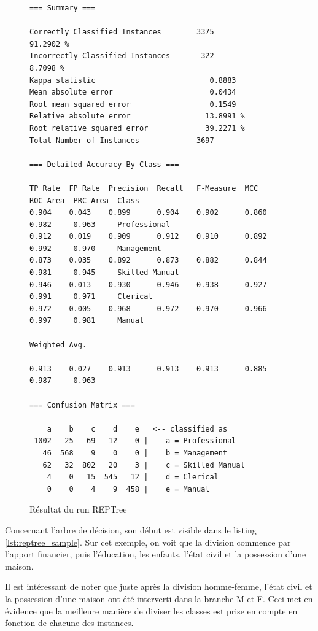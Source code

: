 \begin{figure}[H]
\centering
\begin{lstlisting}
=== Summary ===

Correctly Classified Instances        3375               91.2902 %
Incorrectly Classified Instances       322                8.7098 %
Kappa statistic                          0.8883
Mean absolute error                      0.0434
Root mean squared error                  0.1549
Relative absolute error                 13.8991 %
Root relative squared error             39.2271 %
Total Number of Instances             3697

=== Detailed Accuracy By Class ===

TP Rate  FP Rate  Precision  Recall   F-Measure  MCC      ROC Area  PRC Area  Class
0.904    0.043    0.899      0.904    0.902      0.860    0.982     0.963     Professional
0.912    0.019    0.909      0.912    0.910      0.892    0.992     0.970     Management
0.873    0.035    0.892      0.873    0.882      0.844    0.981     0.945     Skilled Manual
0.946    0.013    0.930      0.946    0.938      0.927    0.991     0.971     Clerical
0.972    0.005    0.968      0.972    0.970      0.966    0.997     0.981     Manual

Weighted Avg.

0.913    0.027    0.913      0.913    0.913      0.885    0.987     0.963

=== Confusion Matrix ===

    a    b    c    d    e   <-- classified as
 1002   25   69   12    0 |    a = Professional
   46  568    9    0    0 |    b = Management
   62   32  802   20    3 |    c = Skilled Manual
    4    0   15  545   12 |    d = Clerical
    0    0    4    9  458 |    e = Manual
\end{lstlisting}
\caption{Résultat du run REPTree}
\label{lst:reptree_res}
\end{figure}

Concernant l'arbre de décision, son début est visible dans le listing \autoref{lst:reptree_sample}. Sur cet exemple, on voit que la division commence par l'apport financier, puis l'éducation, les enfants, l'état civil et la possession d'une maison.

Il est intéressant de noter que juste après la division homme-femme, l'état civil et la possession d'une maison ont été interverti dans la branche M et F. Ceci met en évidence que la meilleure manière de diviser les classes est prise en compte en fonction de chacune des instances.

